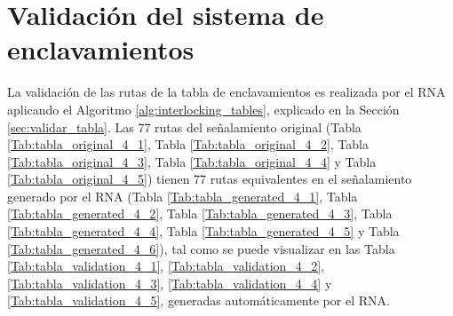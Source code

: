 \section{Validación del sistema de enclavamientos}

    La validación de las rutas de la tabla de enclavamientos es realizada por el RNA aplicando el Algoritmo \ref{alg:interlocking_tables}, explicado en la Sección \ref{sec:validar_tabla}. Las 77 rutas del señalamiento original (Tabla \ref{Tab:tabla_original_4_1}, Tabla \ref{Tab:tabla_original_4_2}, Tabla \ref{Tab:tabla_original_4_3}, Tabla \ref{Tab:tabla_original_4_4} y Tabla \ref{Tab:tabla_original_4_5}) tienen 77 rutas equivalentes en el señalamiento generado por el RNA (Tabla \ref{Tab:tabla_generated_4_1}, Tabla \ref{Tab:tabla_generated_4_2}, Tabla \ref{Tab:tabla_generated_4_3}, Tabla \ref{Tab:tabla_generated_4_4}, Tabla \ref{Tab:tabla_generated_4_5} y Tabla \ref{Tab:tabla_generated_4_6}), tal como se puede visualizar en las Tabla \ref{Tab:tabla_validation_4_1}, \ref{Tab:tabla_validation_4_2}, \ref{Tab:tabla_validation_4_3}, \ref{Tab:tabla_validation_4_4} y \ref{Tab:tabla_validation_4_5}, generadas automáticamente por el RNA.

